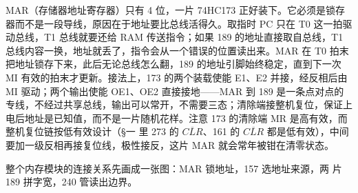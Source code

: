 MAR（存储器地址寄存器）只有 4 位，一片 74HC173 正好装下。它必须是锁存器而不是一段导线，原因在于地址要比总线活得久。取指时 PC 只在 T0 这一拍驱动总线，T1 总线就要还给 RAM 传送指令；如果 189 的地址直接取自总线，T1 总线内容一换，地址就丢了，指令会从一个错误的位置读出来。MAR 在 T0 拍末把地址锁存下来，此后无论总线怎么翻，189 的地址引脚始终稳定，直到下一次 MI 有效的拍末才更新。接法上，173 的两个装载使能 E1、E2 并接，经反相后由 MI 驱动；两个输出使能 OE1、OE2 直接接地——MAR 到 189 是一条点对点的专线，不经过共享总线，输出可以常开，不需要三态；清除端接整机复位，保证上电后地址是已知值，而不是一片随机花样。注意 173 的清除端 MR 是高有效，而整机复位链按低有效设计（§一 里 273 的 $\overline{CLR}$、161 的 $\overline{CLR}$ 都是低有效），中间要加一级反相再接复位线，极性接反，这片 MAR 就会常年被钳在清零状态。

整个内存模块的连接关系先画成一张图：MAR 锁地址，157 选地址来源，两
片 189 拼字宽，240 管读出边界。

